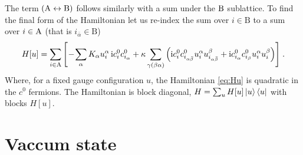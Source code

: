 The term $(\mathrm{A} \leftrightarrow \mathrm{B} )$ follows similarly with a sum under the $\mathrm{B}$ sublattice.
To find the final form of the Hamiltonian let us re-index the sum over $i\in\mathrm B$ to a sum over $i\in\mathrm{A}$ (that is $i_{\bar{\alpha}} \in \mathrm B$)
\begin{equation}
    H[u]=  \sum_{i\in\mathrm A} \Bigg[ \!
    -\!\sum_{\alpha} K_{\alpha} u_i^\alpha \, \im c_i^0 c_{i_\alpha}^0
    + \kappa \sum_{\gamma(\beta \alpha )} \Big(
    \im  c_i^0  c_{i_{\alpha\bar{\beta}}}^0  u_i^\alpha u_{i_{\alpha\bar{\beta}}}^\beta  +
    \im c_{i_\alpha}^0 c_{i_{ {\beta}}}^0 u_{i}^\alpha     u_{i}^\beta \Big) \Bigg] \; .
    \label{eq:Hu}
\end{equation}
Where, for a fixed gauge configuration $u$, the Hamiltonian \eqref{eq:Hu} is quadratic in the $c^0$ fermions.
The Hamiltonian is block diagonal, $H=\sum_u H[u] \ket{u}\bra{u}$ with blocks $H[u]$.




\section{Vaccum state}

